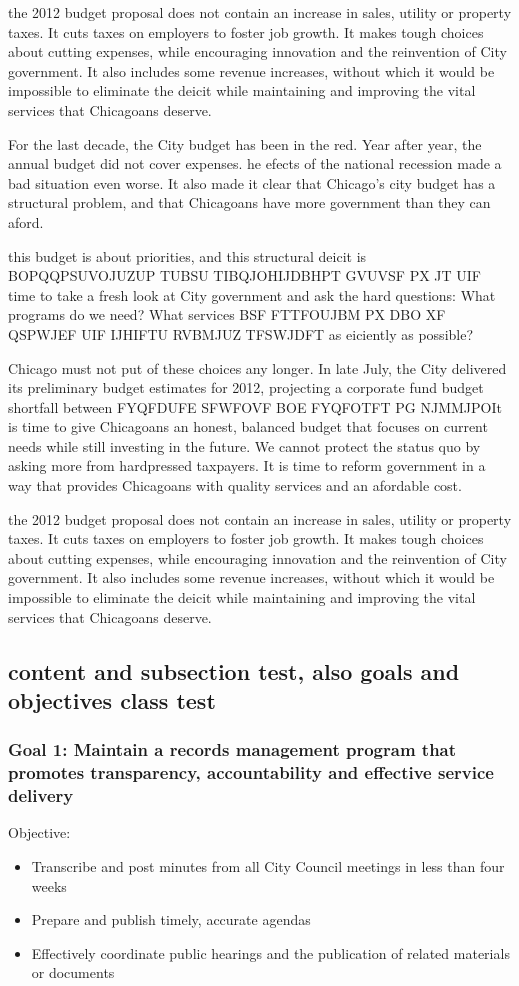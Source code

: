 {{     the 2012 budget proposal does not contain an increase in sales, utility or property taxes. It cuts taxes on employers to foster job growth. It makes tough choices about cutting expenses, while encouraging innovation and the reinvention of City government. It also includes some revenue increases, without which it would be impossible to eliminate the deicit while maintaining and improving the vital services that Chicagoans deserve.

For the last decade, the City budget has been in the red. Year after year, the annual budget did not cover expenses.  he efects of the national recession made a bad situation even worse. It also made it clear that Chicago's city budget has a structural problem, and that Chicagoans have more government than they can aford.

 this budget is about priorities, and this structural deicit is BOPQQPSUVOJUZUP TUBSU TIBQJOHIJDBHPT GVUVSF PX JT UIF time to take a fresh look at City government and ask the hard questions: What programs do we need? What services BSF FTTFOUJBM  PX DBO XF QSPWJEF UIF IJHIFTU RVBMJUZ TFSWJDFT as eiciently as possible?

     Chicago must not put of these choices any longer. In late July, the City delivered its preliminary budget estimates for 2012, projecting a corporate fund budget shortfall between FYQFDUFE SFWFOVF BOE FYQFOTFT PG NJMMJPOIt is time to give Chicagoans an honest, balanced budget that focuses on current needs while still investing in the future.  We cannot protect the status quo by asking more from hardpressed taxpayers.  It is time to reform government in a way that provides Chicagoans with quality services and an afordable cost.

     the 2012 budget proposal does not contain an increase in sales, utility or property taxes. It cuts taxes on employers to foster job growth. It makes tough choices about cutting expenses, while encouraging innovation and the reinvention of City government. It also includes some revenue increases, without which it would be impossible to eliminate the deicit while maintaining and improving the vital services that Chicagoans deserve.
}}
\subsection{content and subsection test, also goals and objectives class test}
\subsubsection{Goal 1: Maintain a records management program that promotes transparency, accountability and effective service delivery}
Objective:
\begin{itemize}
\bulletl
\item Transcribe and post minutes from all City Council meetings in less than four weeks
\item Prepare and publish timely, accurate agendas
\item Effectively coordinate public hearings and the publication of related materials or documents
\end{itemize}
